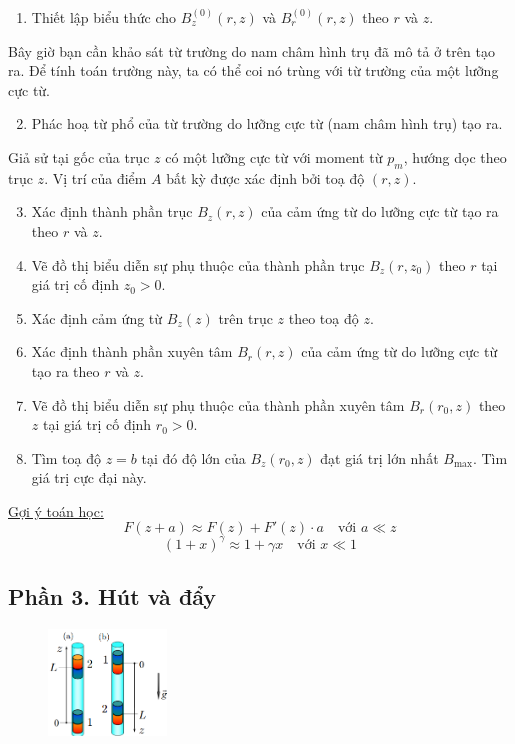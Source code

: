 \begin{enumerate}
  \item Thiết lập biểu thức cho $B^{(0)}_z(r,z)$ và $B^{(0)}_r(r,z)$ theo $r$ và $z$.
\end{enumerate}
\noindent Bây giờ bạn cần khảo sát từ trường do nam châm hình trụ đã mô tả ở trên tạo ra. Để tính toán trường này, ta có thể coi nó trùng với từ trường của một lưỡng cực từ.
\begin{enumerate}
  \setcounter{enumi}{1}
  \item Phác hoạ từ phổ của từ trường do lưỡng cực từ (nam châm hình trụ) tạo ra.
\end{enumerate}
\noindent Giả sử tại gốc của trục $z$ có một lưỡng cực từ với moment từ $p_m$, hướng dọc theo trục $z$. Vị trí của điểm $A$ bất kỳ được xác định bởi toạ độ $(r,z)$.
\begin{enumerate}
  \setcounter{enumi}{2}
  \item Xác định thành phần trục $B_z(r, z)$ của cảm ứng từ do lưỡng cực từ tạo ra theo $r$ và $z$.
  \item Vẽ đồ thị biểu diễn sự phụ thuộc của thành phần trục $B_z(r, z_0)$ theo $r$ tại giá trị cố định $z_0 > 0$.
  \item Xác định cảm ứng từ $B_z(z)$ trên trục $z$ theo toạ độ $z$.
  \item Xác định thành phần xuyên tâm $B_r(r, z)$ của cảm ứng từ do lưỡng cực từ tạo ra theo $r$ và $z$.
  \item Vẽ đồ thị biểu diễn sự phụ thuộc của thành phần xuyên tâm $B_r(r_0, z)$ theo $z$ tại giá trị cố định $r_0 > 0$.
  \item Tìm toạ độ $z = b$ tại đó độ lớn của $B_z(r_0, z)$ đạt giá trị lớn nhất $B_{\text{max}}$. Tìm giá trị cực đại này.
\end{enumerate}
\underline{{Gợi ý toán học:}}
\begin{equation*}
  F(z + a) \approx F(z) + F'(z) \cdot a \quad \text{với } a \ll z
\end{equation*}
\begin{equation*}
  (1 + x)^\gamma \approx 1 + \gamma x \quad \text{với } x \ll 1
\end{equation*}

\subsection*{Phần 3. Hút và đẩy}
\begin{figure}
  \centering
  \vspace{-0.55cm}\hspace{-1cm}
  \includegraphics[width=0.28\textwidth]{Figures/Problems/Fig 2.8.png}
\end{figure}

